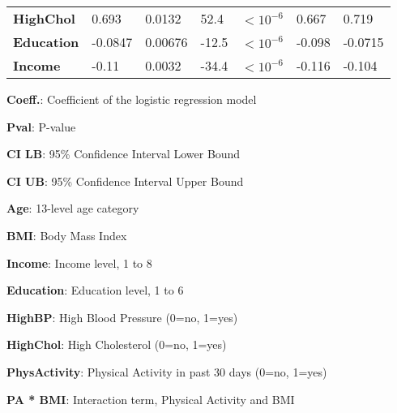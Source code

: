 \documentclass[11pt]{article}
\begin{document}
\begin{table}[h]
\begin{threeparttable}
{\begin{tabular}{lllllll}
\textbf{HighChol} & \raisebox{2ex}{\hypertarget{C7a}{}}0.693 & \raisebox{2ex}{\hypertarget{C7b}{}}0.0132 & \raisebox{2ex}{\hypertarget{C7c}{}}52.4 & $<$\raisebox{2ex}{\hypertarget{C7d}{}}$10^{-6}$ & \raisebox{2ex}{\hypertarget{C7e}{}}0.667 & \raisebox{2ex}{\hypertarget{C7f}{}}0.719 \\
\textbf{Education} & \raisebox{2ex}{\hypertarget{C8a}{}}-0.0847 & \raisebox{2ex}{\hypertarget{C8b}{}}0.00676 & \raisebox{2ex}{\hypertarget{C8c}{}}-12.5 & $<$\raisebox{2ex}{\hypertarget{C8d}{}}$10^{-6}$ & \raisebox{2ex}{\hypertarget{C8e}{}}-0.098 & \raisebox{2ex}{\hypertarget{C8f}{}}-0.0715 \\
\textbf{Income} & \raisebox{2ex}{\hypertarget{C9a}{}}-0.11 & \raisebox{2ex}{\hypertarget{C9b}{}}0.0032 & \raisebox{2ex}{\hypertarget{C9c}{}}-34.4 & $<$\raisebox{2ex}{\hypertarget{C9d}{}}$10^{-6}$ & \raisebox{2ex}{\hypertarget{C9e}{}}-0.116 & \raisebox{2ex}{\hypertarget{C9f}{}}-0.104 \\
\bottomrule
\end{tabular}}
\begin{tablenotes}
\footnotesize
\item \textbf{Coeff.}: Coefficient of the logistic regression model
\item \textbf{Pval}: P-value
\item \textbf{CI LB}: 95\% Confidence Interval Lower Bound
\item \textbf{CI UB}: 95\% Confidence Interval Upper Bound
\item \textbf{Age}: 13-level age category
\item \textbf{BMI}: Body Mass Index
\item \textbf{Income}: Income level, 1 to 8
\item \textbf{Education}: Education level, 1 to 6
\item \textbf{HighBP}: High Blood Pressure (0=no, 1=yes)
\item \textbf{HighChol}: High Cholesterol (0=no, 1=yes)
\item \textbf{PhysActivity}: Physical Activity in past 30 days (0=no, 1=yes)
\item \textbf{PA * BMI}: Interaction term, Physical Activity and BMI
\end{tablenotes}
\end{threeparttable}
\end{table}
\end{document}
